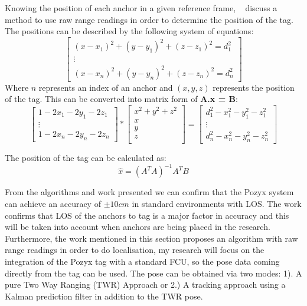 Knowing the position of each anchor in a given reference frame, ~\citet{evaluwb} discuss a method to use raw range readings in order to determine the position of the tag.
The positions can be described by the following system of equations:
        \begin{equation}
                \left[
            \begin{array}{c}
                (x - x_1)^2 + (y - y_1)^2 + (z - z_1)^2 = d_1^2\\
                \vdots\\
                (x - x_n)^2 + (y - y_n)^2 + (z - z_n)^2 = d_n^2
            \end{array}
                \right]
        \end{equation}
        Where $n$ represents an index of an anchor and $(x,y,z)$ represents the position of the tag.
        This can be converted into matrix form of \textbf{A.x = B}:
        \begin{equation}
            \left[
            \begin{array}{c}
                1 - 2x_1 -2y_1 -2z_1\\
                \vdots\\
                1 - 2x_n -2y_n -2z_n
            \end{array}
            \right]
        *
            \left[
                \begin{array}{c}
                    x^2 + y^2 +z^2\\
                    x\\
                    y\\
                    z\\
                \end{array}
            \right]
            =
        \left[
            \begin{array}{c}
                d_1^2 - x_1^2 - y_1^2 -z_1^2\\
                \vdots\\
                d_n^2 - x_n^2 - y_n^2 -z_n^2
            \end{array}
        \right]
       \end{equation}

        The position of the tag can be calculated as:
        \[
            \hat{x} = (A^{T}A)^{-1}A^{T}B
        \]

From the algorithms and work presented we can confirm that the Pozyx system can achieve an accuracy of $\pm10cm$ in standard environments with LOS.
The work confirms that LOS of the anchors to tag is a major factor in accuracy and this will be taken into account when anchors are being placed in the research.
Furthermore, the work mentioned in this section proposes an algorithm with raw range readings in order to do localisation, my research will focus on the integration of the Pozyx tag with a standard FCU, so the pose data coming directly from the tag can be used.
The pose can be obtained via two modes: 1). A pure Two Way Ranging (TWR) Approach or 2.) A tracking approach using a Kalman prediction filter in addition to the TWR pose.


